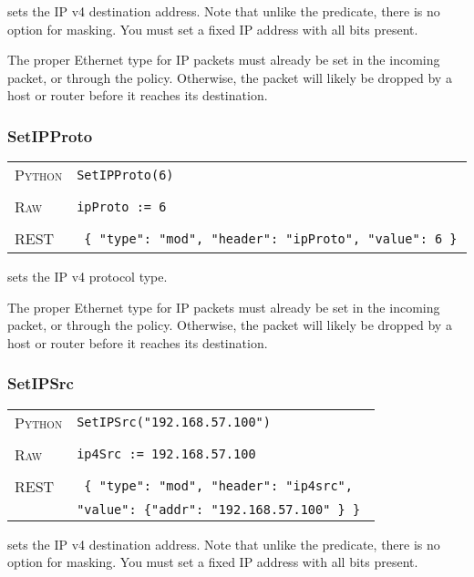  sets the IP v4 destination address.  Note that unlike the  predicate,
there is no option for masking.  You must set a fixed IP address with all bits present.    

The proper Ethernet type for IP packets must already be set in the incoming packet, or through the 
 policy.  Otherwise, the packet will likely be dropped by a host or router before it 
reaches its destination.

\subsubsection{SetIPProto}

\bigskip
\begin{tabularx}{\linewidth}{lX}
\textsc{Python}   & \texttt{SetIPProto(6)} \\ \\
\textsc{Raw}    & \texttt{ipProto := 6}     \\ \\
\textsc{REST} & \texttt{ \{ "type": "mod", "header": "ipProto", "value": 6 \} }
\end{tabularx}

 sets the IP v4 protocol type.      

The proper Ethernet type for IP packets must already be set in the incoming packet, or through the 
 policy.  Otherwise, the packet will likely be dropped by a host or router before it 
reaches its destination.

\subsubsection{SetIPSrc}

\bigskip
\begin{tabularx}{\linewidth}{lX}
\textsc{Python}   & \texttt{SetIPSrc("192.168.57.100")} \\ \\
\textsc{Raw}    & \texttt{ip4Src := 192.168.57.100}     \\ \\
\textsc{REST} & \texttt{ \{ "type": "mod", "header": "ip4src", } \\
  & \texttt{"value": \{"addr": "192.168.57.100" \} \} }
\end{tabularx}

 sets the IP v4 destination address.  Note that unlike the  predicate,
there is no option for masking.  You must set a fixed IP address with all bits present.    

